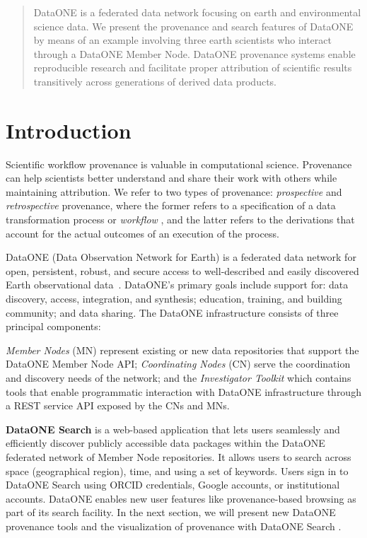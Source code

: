\documentclass[a4paper]{llncs}
\newcommand{\mypara}[1]{\vspace{4pt}\noindent\textbf{#1}}
\begin{document}
\begin{abstract}
  DataONE is a federated data network focusing on earth and environmental science data. We present the provenance and search features of DataONE by means of an example involving three earth scientists who interact through a DataONE Member Node. DataONE provenance systems enable reproducible research and facilitate proper attribution of scientific results transitively across generations of derived data products.
 \end{abstract}




\section{Introduction}

Scientific workflow provenance is valuable in computational science. Provenance can help scientists better understand and share their work with others while maintaining attribution. We refer to two types of provenance: \emph{prospective} and \emph{retrospective} provenance, where the former refers to a specification of a data transformation process or \emph{workflow} \cite{Freire2008}, and the latter refers to the derivations that account for the actual outcomes of an execution of the process.

DataONE (Data Observation Network for Earth) is a federated data network for open, persistent, robust, and secure access to well-described and easily discovered Earth observational data~\cite{dataone}. DataONE's primary goals include support for: data discovery, access, integration, and synthesis; education, training, and building community; and data sharing. The DataONE infrastructure consists of three principal components:

\emph{Member Nodes} (MN) represent existing or new data repositories that support the DataONE Member Node API; \emph{Coordinating Nodes} (CN) serve the coordination and discovery needs of the network; and the \emph{Investigator Toolkit} which contains tools that enable programmatic interaction with DataONE infrastructure through a REST service API exposed by the CNs and MNs.


\mypara{DataONE Search} is a web-based application that lets users seamlessly and efficiently discover publicly accessible data packages within the DataONE federated network of Member Node repositories. It allows users to search across space (geographical region), time, and using a set of keywords. Users sign in to DataONE Search using ORCID credentials, Google accounts, or institutional accounts. DataONE enables new user features like provenance-based browsing as part of its search facility. In the next section, we will present new DataONE provenance tools and the visualization of provenance with DataONE Search \cite{dataone}.
\end{document}
